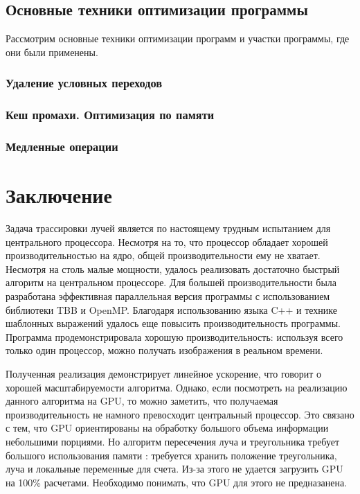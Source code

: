 \documentclass[12pt, a4paper, utf8]{article}
\begin{document}
\subsection{Основные техники оптимизации программы}

Рассмотрим основные техники оптимизации программ и участки программы, где они были применены.

\subsubsection{Удаление условных переходов}


\subsubsection{Кеш промахи. Оптимизация по памяти}


\subsubsection{Медленные операции}



\newpage
\section*{Заключение}
Задача трассировки лучей является по настоящему трудным испытанием для центрального процессора. Несмотря на то, что процессор обладает хорошей производительностью на ядро, общей производительности ему не хватает. Несмотря на столь малые мощности, удалось реализовать достаточно быстрый алгоритм на центральном процессоре. Для большей производительности была разработана эффективная параллельная версия программы с использованием библиотеки TBB и OpenMP. Благодаря использованию языка C++ и технике шаблонных выражений удалось еще повысить производительность программы. Программа продемонстрировала хорошую производительность: используя всего только один процессор, можно получать изображения в реальном времени.

Полученная реализация демонстрирует линейное ускорение, что говорит о хорошей масштабируемости алгоритма. Однако, если посмотреть на реализацию данного алгоритма на GPU, то можно заметить, что получаемая производительность не намного превосходит центральный процессор. Это связано с тем, что GPU ориентированы на обработку большого объема информации небольшими порциями. Но алгоритм пересечения луча и треугольника требует большого использования памяти : требуется хранить положение треугольника, луча и локальные переменные для счета. Из-за этого не удается загрузить GPU на 100\% расчетами. Необходимо понимать, что GPU для этого не предназанена.
\end{document}
